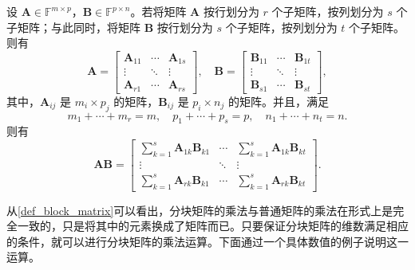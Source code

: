 \begin{definition}[分块矩阵乘法]
    \label{def_block_matrix}
    设 \(\mathbf{A}\in\mathbb{F}^{m\times p}\)，\(\mathbf{B}\in\mathbb{F}^{p \times n}\)。若将矩阵 \(\mathbf{A}\) 按行划分为 \(r\) 个子矩阵，按列划分为 \(s\) 个子矩阵；与此同时，将矩阵 \(\mathbf{B}\) 按行划分为 \(s\) 个子矩阵，按列划分为 \(t\) 个子矩阵。则有
    \[
        \mathbf{A}=
        \begin{bmatrix}
            \mathbf{A}_{11} & \cdots & \mathbf{A}_{1s} \\
            \vdots          & \ddots & \vdots          \\
            \mathbf{A}_{r1} & \cdots & \mathbf{A}_{rs}
        \end{bmatrix},
        \quad
        \mathbf{B}=
        \begin{bmatrix}
            \mathbf{B}_{11} & \cdots & \mathbf{B}_{1t} \\
            \vdots          & \ddots & \vdots          \\
            \mathbf{B}_{s1} & \cdots & \mathbf{B}_{st}
        \end{bmatrix},
    \]
    其中，\(\mathbf{A}_{ij}\) 是 \(m_i \times p_j\) 的矩阵，\(\mathbf{B}_{ij}\) 是 \(p_i \times n_j\) 的矩阵。并且，满足
    \[
        m_1+\cdots+m_r=m, \quad p_1+\cdots+p_s=p, \quad n_1+\cdots+n_t=n.
    \]
    则有
    \[
        \mathbf{A}\mathbf{B}=
        \begin{bmatrix}
            \sum_{k=1}^{s}\mathbf{A}_{1k}\mathbf{B}_{k1} & \cdots & \sum_{k=1}^{s}\mathbf{A}_{1k}\mathbf{B}_{kt} \\
            \vdots                                       & \ddots & \vdots                                       \\
            \sum_{k=1}^{s}\mathbf{A}_{rk}\mathbf{B}_{k1} & \cdots & \sum_{k=1}^{s}\mathbf{A}_{rk}\mathbf{B}_{kt}
        \end{bmatrix}.
    \]
\end{definition}

从\cref{def_block_matrix}可以看出，分块矩阵的乘法与普通矩阵的乘法在形式上是完全一致的，只是将其中的元素换成了矩阵而已。只要保证分块矩阵的维数满足相应的条件，就可以进行分块矩阵的乘法运算。下面通过一个具体数值的例子说明这一运算。

